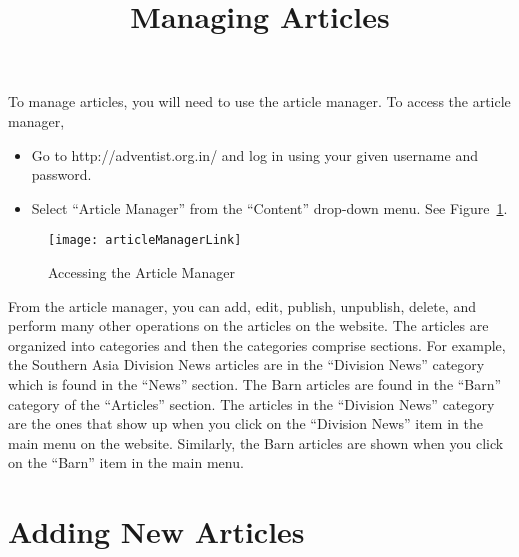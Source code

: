 \documentclass{howto}
\begin{document}
\title{Managing Articles}
\maketitle

To manage articles, you will need to use the article manager.  To access the article manager, 

\begin{itemize}
\item{Go to http://adventist.org.in/ and log in using your given username and password.}
\item{Select ``Article Manager'' from the ``Content'' drop-down menu. See Figure~\ref{frontPageLink}. }
\end{itemize}

\begin{figure}[h]
  \begin{center}
    \texttt{[image: articleManagerLink]}
  \end{center}
  \caption{Accessing the Article Manager}
  \label{frontPageLink}
\end{figure}

From the article manager, you can add, edit, publish, unpublish, delete, and perform many other operations on the articles on the website.
The articles are organized into categories and then the categories comprise sections.  For example, the Southern Asia Division News articles are in the ``Division News'' category which is found in the “News” section.  The Barn articles are found in the “Barn” category of the “Articles” section.  The articles in the “Division News” category are the ones that show up when you click on the “Division News” item in the main menu on the website.  Similarly, the Barn articles are shown when you click on the “Barn” item in the main menu.

\section{Adding New Articles}
\end{document}
